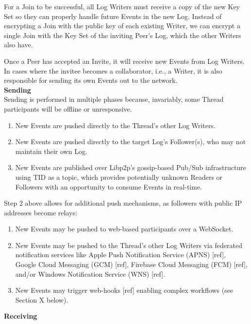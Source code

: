 \documentclass{comjnl}
\begin{document}
For a Join to be successful, all Log Writers must receive a copy of the new Key Set so they can properly handle future Events in the new Log. Instead of encrypting a Join with the public key of each existing Writer, we can encrypt a single Join with the Key Set of the inviting Peer’s Log, which the other Writers also have.

Once a Peer has accepted an Invite, it will receive new Events from Log Writers. In cases where the invitee becomes a collaborator, i.e., a Writer, it is also responsible for sending its own Events out to the network.\\

\textbf{Sending} \\

Sending is performed in multiple phases because, invariably, some Thread participants will be offline or unresponsive. 

\begin{enumerate}
\item \label{Perf1}New Events are pushed directly to the Thread’s other Log Writers.
\item \label{Perf2}New Events are pushed directly to the target Log’s Follower(s), who may not maintain their own Log.
\item \label{Perf3} New Events are published over Libp2p’s gossip-based Pub/Sub infrastructure using TID as a topic, which provides potentially unknown Readers or Followers with an opportunity to consume Events in real-time.
\end{enumerate}

Step 2 above allows for additional push mechanisms, as followers with public IP addresses become relays:

\begin{enumerate}
\item \label{Perf1}New Events may be pushed to web-based participants over a WebSocket.
\item \label{Perf2}New Events may be pushed to the Thread’s other Log Writers via federated notification services like Apple Push Notification Service (APNS) [ref], Google Cloud Messaging (GCM) [ref], Firebase Cloud Messaging (FCM) [ref], and/or Windows Notification Service (WNS) [ref].
\item \label{Perf3} New Events may trigger web-hooks [ref] enabling complex workflows (see Section X below).\\
\end{enumerate}

\textbf{Receiving} \\
\end{document}

